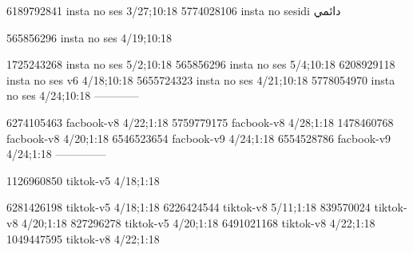 
6189792841 insta no ses
3/27;10:18
5774028106 insta no sesidi
دائمي

565856296 insta no ses
4/19;10:18

1725243268 insta no ses
5/2;10:18
565856296 insta no ses
5/4;10:18
6208929118 insta no ses v6
4/18;10:18
5655724323 insta no ses
4/21;10:18
5778054970 insta no ses
4/24;10:18
------------

6274105463 facbook-v8
4/22;1:18
5759779175 facbook-v8
4/28;1:18
1478460768 facbook-v8
4/20;1:18
6546523654 facbook-v9
4/24;1:18
6554528786 facbook-v9
4/24;1:18
--------------

1126960850 tiktok-v5
4/18;1:18

6281426198 tiktok-v5
4/18;1:18
6226424544 tiktok-v8
5/11;1:18
839570024 tiktok-v8
4/20;1:18
827296278 tiktok-v5
4/20;1:18
6491021168 tiktok-v8
4/22;1:18
1049447595 tiktok-v8
4/22;1:18
